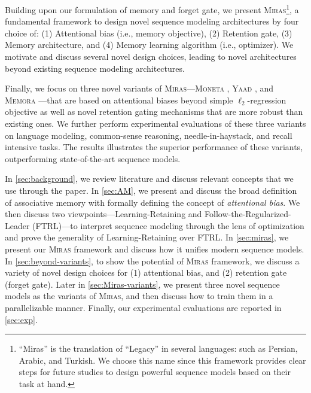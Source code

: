 \documentclass{article}
\newcommand{\framework}[0]{\textsc{Miras}}
\newcommand{\ymodel}[0]{\textsc{Yaad}}
\newcommand{\mmodel}[0]{\textsc{Moneta}}
\newcommand{\xmodel}[0]{\textsc{Memora}}
\theoremstyle{plain}
\theoremstyle{definition}
\theoremstyle{remark}
\newcommand{\head}[1]{\vspace{1.7mm}\noindent{{\textcolor{c2}{\bf #1.}}}}
\begin{document}
Building upon our formulation of memory and forget gate, we present \framework\footnote{\: ``Miras'' is the translation of ``Legacy'' in several languages: such as Persian, Arabic, and Turkish. We choose this name since this framework provides clear steps for future studies to design powerful sequence models based on their task at hand.}, a fundamental framework to design novel sequence modeling architectures by four choice of: (1) Attentional bias (i.e., memory objective), (2) Retention gate, (3) Memory architecture, and (4) Memory learning algorithm (i.e., optimizer). We motivate and discuss several novel design choices, leading to novel architectures beyond existing sequence modeling architectures.

Finally, we focus on three novel variants of \framework—\mmodel
, \ymodel
, and \xmodel
—that are based on attentional biases beyond simple $\ell_2$-regression objective as well as novel retention gating mechanisms that are more robust than existing ones. We further perform experimental evaluations of these three variants on language modeling, common-sense reasoning, needle-in-haystack, and recall intensive tasks. The results illustrates the superior performance of these variants, outperforming state-of-the-art sequence models. 

\head{Roadmap} In \autoref{sec:background}, we review literature and discuss relevant concepts that we use through the paper. In \autoref{sec:AM}, we present and discuss the broad definition of associative memory with formally defining the concept of \emph{attentional bias}. We then discuss two viewpoints—Learning-Retaining and Follow-the-Regularized-Leader (FTRL)—to interpret sequence modeling through the lens of optimization and prove the generality of Learning-Retaining over FTRL. In \autoref{sec:miras}, we present our \framework{} framework and discuss how it unifies modern sequence models. In \autoref{sec:beyond-variants}, to show the potential of \framework{} framework, we discuss a variety of novel design choices for (1) attentional bias, and (2) retention gate (forget gate). Later in \autoref{sec:Miras-variants}, we present three novel sequence models as the variants of \framework, and then discuss how to train them in a parallelizable manner. Finally, our experimental evaluations are reported in \autoref{sec:exp}.  
\end{document}
